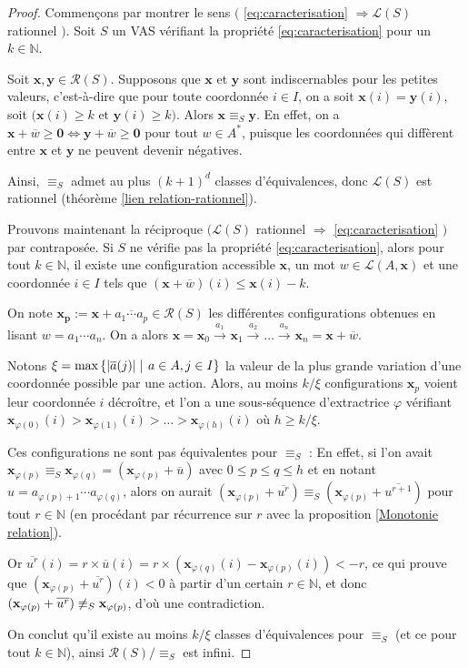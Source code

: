 \documentclass[a4paper,final]{article}
\theoremstyle{definition}
\let\phi\varphi
\let\leq\leqslant
\let\geq\geqslant
\newcommand{\set}[2]{\left\{#1\mathrel{\left|\vphantom{#1}\vphantom{#2}\right.}#2\right\}}
\newcommand{\abs}[1]{\ensuremath{\displaystyle\left\lvert #1 \right\rvert}}
\newcommand{\N}{\ensuremath{\mathbb{N}}}
\newcommand{\lang}{\ensuremath{\mathcal{L}}}
\newcommand{\reach}{\ensuremath{\mathcal{R}}}
\newcommand{\trans}[2]{\ensuremath{\stackrel{#1}{\longrightarrow}_{#2}}}
\newcommand{\vect}[1]{\ensuremath{\mathbf{#1}}}
\newcommand{\rel}{\ensuremath{\equiv}}
\newcommand{\equivaut}{\ensuremath{\Leftrightarrow}}
\newcommand{\valeur}[1]{\ensuremath{\overline{#1}}}
\begin{document}
\begin{proof}
Commençons par montrer le sens $\big($ \eqref{eq:caracterisation} $\Rightarrow \lang(S)$ rationnel $\big)$.
Soit $S$ un VAS vérifiant la propriété \eqref{eq:caracterisation} pour un $k\in\N$.

Soit $\vect{x},\vect{y}\in\reach(S)$.
Supposons que $\vect{x}$ et $\vect{y}$ sont indiscernables pour les petites valeurs, c'est-à-dire que pour toute coordonnée $i\in I$, on a 
soit $\vect{x}(i)=\vect{y}(i)$, 
soit $\big( \vect{x}(i)\geq k \text{ et } \vect{y}(i)\geq k \big)$.
Alors $\vect{x}\rel_S \vect{y}$. 
En effet, on a $\vect{x} +\valeur{w} \geq\vect{0} \equivaut \vect{y} +\valeur{w} \geq\vect{0}$ pour tout $w\in A^\ast$, 
puisque les coordonnées qui diffèrent entre $\vect{x}$ et $\vect{y}$ ne peuvent devenir négatives.

Ainsi, $\rel_S$ admet au plus $(k+1)^d$ classes d'équivalences, donc $\lang(S)$ est rationnel (théorème \ref{lien relation-rationnel}).

\vspace{4mm}\noindent
Prouvons maintenant la réciproque $\big(\lang(S)$ rationnel $\Rightarrow$ \eqref{eq:caracterisation} $\big)$ par contraposée.
Si $S$ ne vérifie pas la propriété \eqref{eq:caracterisation}, alors
pour tout $k\in\N$, il existe une configuration accessible $\vect{x}$, un mot $w\in \lang(A,\vect{x})$ et une coordonnée $i\in I$ tels que $(\vect{x} +\valeur{w})(i)\leq \vect{x}(i)-k$.

On note $\vect{x_p}:=\vect{x} +\valeur{a_1\cdots a_p} \in\reach(S)$ les différentes configurations obtenues en lisant $w=a_1\cdots a_n$.
On a alors $\vect{x}=\vect{x}_0 \trans{a_1}{}\vect{x}_1 \trans{a_2}{}\dots \trans{a_n}{}\vect{x}_n= \vect{x} +\valeur{w}$.

Notons $\xi = \text{max}\set{\abs{\valeur{a}(j)}} {a\in A, j\in I}$ la valeur de la plus grande variation d'une coordonnée possible par une action.
Alors, au moins $k/\xi$ configurations $\vect{x}_p$ voient leur coordonnée $i$ décroître,
et l'on a une sous-séquence d'extractrice $\phi$ vérifiant $\vect{x}_{\phi(0)}(i)>\vect{x}_{\phi(1)}(i)>\dots>\vect{x}_{\phi(h)}(i)$ où $h\geq k/\xi$.


Ces configurations ne sont pas équivalentes pour $\rel_S$ :
En effet, si l'on avait $\vect{x}_{\phi(p)}\rel_S \vect{x}_{\phi(q)} = (\vect{x}_{\phi(p)} +\valeur{u})$ avec $0\leq p\leq q\leq h$ et en notant $u=a_{\phi(p)+1}\cdots a_{\phi(q)}$, 
alors on aurait $(\vect{x}_{\phi(p)} +\valeur{u^r}) \rel_S (\vect{x}_{\phi(p)} +\valeur{u^{r+1}})$ pour tout $r\in\N$ (en procédant par récurrence sur $r$ avec la proposition \ref{Monotonie relation}).

Or $\valeur{u^r}(i) = r\times\valeur{u}(i) = r\times (\vect{x}_{\phi(q)}(i) -\vect{x}_{\phi(p)}(i)) < -r$, 
ce qui prouve que $(\vect{x}_{\phi(p)} +\valeur{u^r})(i)<0$ à partir d'un certain $r\in\N$, 
et donc $(\vect{x}_{\phi(p)} +\valeur{u^r}) \not\rel_S \vect{x}_{\phi(p)}$, d'où une contradiction.

On conclut qu'il existe au moins $k/\xi$ classes d'équivalences pour $\rel_S$ (et ce pour tout $k\in\N$), 
ainsi $\reach(S)/\rel_S$ est infini.
\end{proof}
\end{document}
